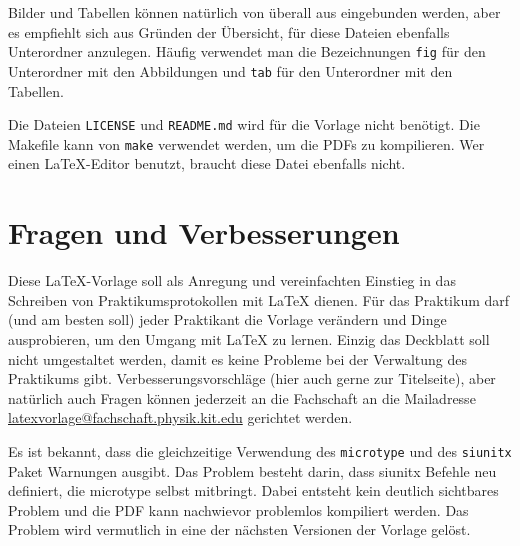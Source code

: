 Bilder und Tabellen können natürlich von überall aus eingebunden werden, aber 
es empfiehlt sich aus Gründen der Übersicht, für diese Dateien ebenfalls 
Unterordner anzulegen. Häufig verwendet man die Bezeichnungen \verb|fig| für den 
Unterordner mit den Abbildungen und \verb|tab| für den Unterordner mit den 
Tabellen.

Die Dateien \verb|LICENSE| und \verb|README.md| wird für die Vorlage nicht 
benötigt. Die Makefile kann von \verb|make| verwendet werden, um die PDFs zu 
kompilieren. Wer einen LaTeX-Editor benutzt, braucht diese Datei ebenfalls 
nicht.



\section{Fragen und Verbesserungen}
Diese LaTeX-Vorlage soll als Anregung und vereinfachten Einstieg in das Schreiben von Praktikumsprotokollen mit LaTeX dienen. Für das Praktikum darf (und am besten soll) jeder Praktikant die Vorlage verändern und Dinge ausprobieren, um den Umgang mit LaTeX zu lernen. Einzig das Deckblatt soll nicht umgestaltet werden, damit es keine Probleme bei der Verwaltung des Praktikums gibt. Verbesserungsvorschläge (hier auch gerne zur Titelseite), aber natürlich auch Fragen können jederzeit an die Fachschaft an die Mailadresse \href{mailto:latexvorlage@fachschaft.physik.kit.edu}{latexvorlage@fachschaft.physik.kit.edu} gerichtet werden.

Es ist bekannt, dass die gleichzeitige Verwendung des \verb|microtype| und des \verb|siunitx| Paket Warnungen ausgibt. Das Problem besteht darin, dass siunitx Befehle neu definiert, die microtype selbst mitbringt. Dabei entsteht kein deutlich sichtbares Problem und die PDF kann nachwievor problemlos kompiliert werden. Das Problem wird vermutlich in eine der nächsten Versionen der Vorlage gelöst.